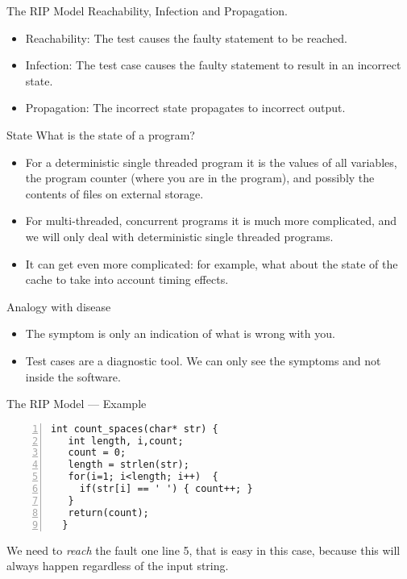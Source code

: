 \documentclass[handout]{beamer}
\begin{document}
\begin{frame}{The RIP Model}
 Reachability,  Infection and Propagation.
  \begin{itemize}
  \item Reachability: The test causes the faulty statement to be
    reached.
  \item Infection: The test case causes the faulty statement to result
    in an incorrect state.
  \item Propagation: The incorrect state propagates to incorrect output.
    \end{itemize}
  \end{frame}
\begin{frame}{State}
    What is the state of a program? 

 \begin{itemize}
   \item  For a deterministic single threaded program it is the values
     of all variables, the program counter (where you are in the
     program), and possibly the contents of files on external
     storage.
   \item For multi-threaded, concurrent programs it is much more
     complicated, and we will only deal with deterministic single
     threaded programs.
   \item It can get even more complicated: for example, what about the
     state of the cache to take into account timing effects.
 \end{itemize}
    
\end{frame}
  \begin{frame}{Analogy with disease}
    \begin{itemize}
    \item The symptom is only an indication of what is wrong with you.
    \item Test cases are a diagnostic tool. We can only see the
      symptoms and not inside the software. 
    \end{itemize}    
  \end{frame}

  \begin{frame}[fragile]{The RIP Model --- Example}
  \begin{lstlisting}[numbers=left]
  int count_spaces(char* str) {
   int length, i,count;
   count = 0;
   length = strlen(str);
   for(i=1; i<length; i++)  { 
     if(str[i] == ' ') { count++; }
   }
   return(count);
  }
\end{lstlisting}
We need to {\em reach} the fault one line 5, that is easy in this case,
because this will always happen regardless of the input string.  
\end{frame}
\end{document}
